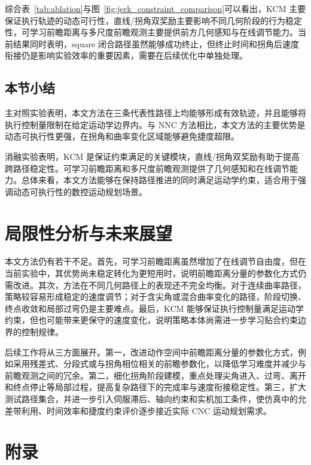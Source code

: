 \documentclass[preprint,12pt]{elsarticle}
\begin{document}
综合表~\ref{tab:ablation}与图~\ref{fig:jerk_constraint_comparison}可以看出，KCM 主要保证执行轨迹的动态可行性，直线/拐角双奖励主要影响不同几何阶段的行为稳定性，可学习前瞻距离与多尺度前瞻观测主要提供前方几何感知与在线调节能力。当前结果同时表明，square 闭合路径虽然能够成功终止，但终止时间和拐角后速度衔接仍是影响实验效率的重要因素，需要在后续优化中单独处理。

\subsection{本节小结}

主对照实验表明，本文方法在三条代表性路径上均能够形成有效轨迹，并且能够将执行控制量限制在给定运动学边界内。与 NNC 方法相比，本文方法的主要优势是动态可执行性更强，在拐角和曲率变化区域能够避免捷度超限。

消融实验表明，KCM 是保证约束满足的关键模块，直线/拐角双奖励有助于提高跨路径稳定性。可学习前瞻距离和多尺度前瞻观测提供了几何感知和在线调节能力。总体来看，本文方法能够在保持路径推进的同时满足运动学约束，适合用于强调动态可执行性的数控运动规划场景。

\section{局限性分析与未来展望}
\label{sec:conclusion}

本文方法仍有若干不足。首先，可学习前瞻距离虽然增加了在线调节自由度，但在当前实验中，其优势尚未稳定转化为更短用时，说明前瞻距离分量的参数化方式仍需改进。其次，方法在不同几何路径上的表现还不完全均衡。对于连续曲率路径，策略较容易形成稳定的速度调节；对于含尖角或混合曲率变化的路径，阶段切换、终点收敛和局部过弯仍是主要难点。最后，KCM 能够保证执行控制量满足运动学约束，但也可能带来更保守的速度变化，说明策略本体尚需进一步学习贴合约束边界的控制规律。

后续工作将从三方面展开。第一，改进动作空间中前瞻距离分量的参数化方式，例如采用残差式、分段式或与拐角相位相关的前瞻参数化，以降低学习难度并减少与前瞻观测之间的冗余。第二，细化拐角阶段建模，重点处理尖角进入、过弯、离开和终点停止等局部过程，提高复杂路径下的完成率与速度衔接稳定性。第三，扩大测试路径集合，并进一步引入伺服滞后、轴向约束和实机加工条件，使仿真中的允差带利用、时间效率和捷度约束评价逐步接近实际 CNC 运动规划需求。

\clearpage
{}
\section*{附录}
\end{document}
